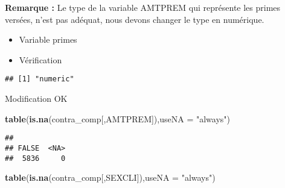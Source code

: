 \documentclass[
]{article}
\newenvironment{Shaded}{\begin{snugshade}}{\end{snugshade}}
\newcommand{\DataTypeTok}[1]{\textcolor[rgb]{0.13,0.29,0.53}{#1}}
\newcommand{\KeywordTok}[1]{\textcolor[rgb]{0.13,0.29,0.53}{\textbf{#1}}}
\newcommand{\NormalTok}[1]{#1}
\newcommand{\OperatorTok}[1]{\textcolor[rgb]{0.81,0.36,0.00}{\textbf{#1}}}
\newcommand{\StringTok}[1]{\textcolor[rgb]{0.31,0.60,0.02}{#1}}
\providecommand{\tightlist}{%
  \setlength{\itemsep}{0pt}\setlength{\parskip}{0pt}}
\begin{document}
\textbf{Remarque :} Le type de la variable AMTPREM qui représente les
primes versées, n'est pas adéquat, nous devons changer le type en
numérique.

\begin{itemize}
\tightlist
\item
  Variable primes
\end{itemize}

\begin{Shaded}
\end{Shaded}

\begin{itemize}
\tightlist
\item
  Vérification
\end{itemize}

\begin{Shaded}
\end{Shaded}

\begin{verbatim}
## [1] "numeric"
\end{verbatim}

Modification OK

\begin{Shaded}
\begin{Highlighting}[]
\KeywordTok{table}\NormalTok{(}\KeywordTok{is.na}\NormalTok{(contra_comp[,AMTPREM]),}\DataTypeTok{useNA =} \StringTok{"always"}\NormalTok{)}
\end{Highlighting}
\end{Shaded}

\begin{verbatim}
## 
## FALSE  <NA> 
##  5836     0
\end{verbatim}

\begin{Shaded}
\begin{Highlighting}[]
\KeywordTok{table}\NormalTok{(}\KeywordTok{is.na}\NormalTok{(contra_comp[,SEXCLI]),}\DataTypeTok{useNA =} \StringTok{"always"}\NormalTok{)}
\end{Highlighting}
\end{Shaded}
\end{document}
